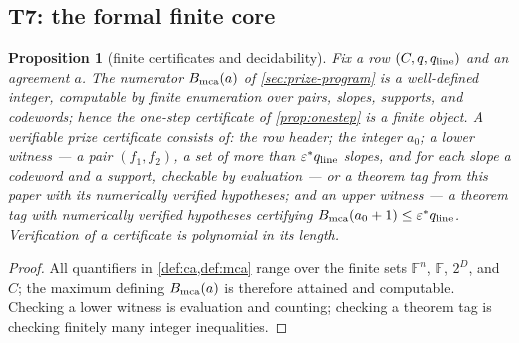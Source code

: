 \documentclass[11pt]{article}
\newtheorem{proposition}[theorem]{Proposition}
\theoremstyle{definition}
\theoremstyle{remark}
\newcommand{\F}{\mathbb{F}}
\begin{document}
\subsection{T7: the formal finite core}\label{sec:discharge-T7}

\begin{proposition}[finite certificates and decidability]\label{prop:finite-certificate}
Fix a row $(C,q,q_{\rm line})$ and an agreement $a$. The numerator $B_{\rm mca}(a)$ of \cref{sec:prize-program} is a well-defined integer, computable by finite enumeration over pairs, slopes, supports, and codewords; hence the one-step certificate of \cref{prop:onestep} is a finite object. A verifiable prize certificate consists of: the row header; the integer $a_0$; a \emph{lower witness} --- a pair $(f_1,f_2)$, a set of more than $\varepsilon^*q_{\rm line}$ slopes, and for each slope a codeword and a support, checkable by evaluation --- or a theorem tag from this paper with its numerically verified hypotheses; and an \emph{upper witness} --- a theorem tag with numerically verified hypotheses certifying $B_{\rm mca}(a_0+1)\le\varepsilon^*q_{\rm line}$. Verification of a certificate is polynomial in its length.
\end{proposition}

\begin{proof}
All quantifiers in \cref{def:ca,def:mca} range over the finite sets $\F^n$, $\F$, $2^D$, and $C$; the maximum defining $B_{\rm mca}(a)$ is therefore attained and computable. Checking a lower witness is evaluation and counting; checking a theorem tag is checking finitely many integer inequalities.
\end{proof}
\end{document}
